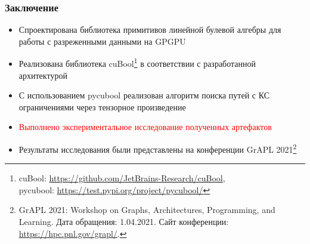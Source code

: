 \documentclass[xcolor=table,english]{beamer}
\begin{document}
\begin{frame}[fragile] \frametitle{Заключение}
    \begin{itemize}
        \item Спроектирована библиотека примитивов линейной булевой алгебры для работы с разреженными данными на GPGPU
        \item Реализована библиотека cuBool\footnote{cuBool: \url{https://github.com/JetBrains-Research/cuBool},\\pycubool: \url{https://test.pypi.org/project/pycubool/}} в соответствии с разработанной архитектурой
        \item С использованием pycubool реализован алгоритм поиска путей с КС ограничениями через тензорное произведение
        \item \textcolor{red}{Выполнено экспериментальное исследование полученных артефактов}
        \break
        \item  Результаты исследования были представлены на конференции GrAPL 2021\footnote{GrAPL 2021: Workshop on Graphs, Architectures, Programming, and Learning. Дата обращения: 1.04.2021. Сайт конференции: \url{https://hpc.pnl.gov/grapl/}.}
    \end{itemize}
\end{frame}


\end{document}
